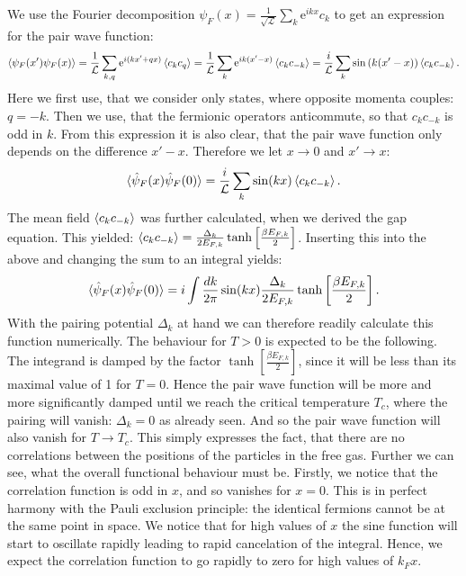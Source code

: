 We use the Fourier decomposition $\psi_F(x) = \frac{1}{\sqrt{\mathcal{L}}} \sum_k \text{e}^{ikx} c_k$ to get an expression for the pair wave function:
\begin{equation}
\braket{\psi_F(x')\psi_F(x)} = \frac{1}{\mathcal{L}} \sum_{k,q} \text{e}^{i(kx' + qx)}\braket{c_{k}c_{q}} = \frac{1}{\mathcal{L}} \sum_{k} \text{e}^{ik(x' - x)}\braket{c_{k}c_{-k}} = \frac{i}{\mathcal{L}} \sum_{k} \sin\left(k(x' - x)\right)\braket{c_{k}c_{-k}}. \nonumber 
\end{equation}
Here we first use, that we consider only states, where opposite momenta couples: $q = -k$. Then we use, that the fermionic operators anticommute, so that $c_kc_{-k}$ is odd in $k$. From this expression it is also clear, that the pair wave function only depends on the difference $x'-x$. Therefore we let $x \to 0$ and $x' \to x$:
\begin{equation}
\braket{\hat{\psi}_F(x) \hat{\psi}_F(0)} = \frac{i}{\mathcal{L}}\sum_{k} \sin(kx)\braket{c_{k}c_{-k}}. \nonumber
\end{equation}
The mean field $\braket{c_{k}c_{-k}}$ was further calculated, when we derived the gap equation. This yielded: $\braket{c_{k}c_{-k}} = \frac{\Delta_k}{2E_{F,k}}\tanh\left[\frac{\beta E_{F,k} }{2}\right]$. Inserting this into the above and changing the sum to an integral yields:
\begin{equation}
\braket{\hat{\psi}_F(x) \hat{\psi}_F(0)} = i\int \frac{dk}{2\pi} \sin(kx)\frac{\Delta_k}{2E_{F,k}}\tanh\left[\frac{ \beta E_{F,k} }{2}\right].
\label{eq.pairwavefunction}
\end{equation}
With the pairing potential $\Delta_k$ at hand we can therefore readily calculate this function numerically. The behaviour for $T > 0$ is expected to be the following. The integrand is damped by the factor $\tanh\left[\frac{ \beta E_{F,k} }{2}\right]$, since it will be less than its maximal value of 1 for $T = 0$. Hence the pair wave function will be more and more significantly damped until we reach the critical temperature $T_c$, where the pairing will vanish: $\Delta_k = 0$ as already seen. And so the pair wave function will also vanish for $T\to T_c$. This simply expresses the fact, that there are no correlations between the positions of the particles in the free gas. Further we can see, what the overall functional behaviour must be. Firstly, we notice that the correlation function is odd in $x$, and so vanishes for $x = 0$. This is in perfect harmony with the Pauli exclusion principle: the identical fermions cannot be at the same point in space. We notice that for high values of $x$ the sine function will start to oscillate rapidly leading to rapid cancelation of the integral. Hence, we expect the correlation function to go rapidly to zero for high values of $k_F x$. 

